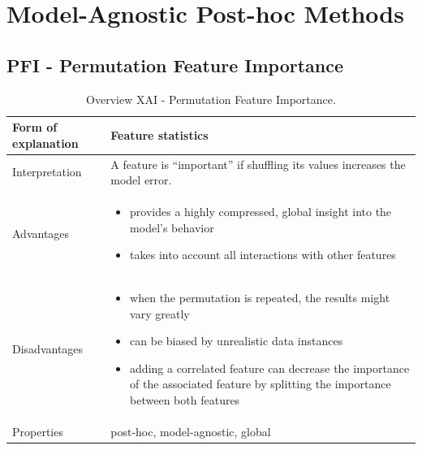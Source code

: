 
\newpage
\section{Model-Agnostic Post-hoc Methods}\label{sec:4}

\subsection{PFI - Permutation Feature Importance}

\begin{table}[H]
  \centering
  \begin{tabular}{|p{}|p{}|}
    \hline
    Form of \newline explanation & 
    Feature statistics \\
    
    \hline
    Interpretation & 
    A feature is “important” if shuffling its values increases the model error. \\
    \hline
    Advantages &
    \begin{itemize}[nosep, left=0em]
        \item provides a highly compressed, global insight into the model’s behavior
        \item takes into account all interactions with other features
    \end{itemize} \\
    
    \hline
    Disadvantages &
    \begin{itemize}[nosep, left=0em]
        \item when the permutation is repeated, the results might vary greatly
        \item can be biased by unrealistic data instances
        \item adding a correlated feature can decrease the importance of the associated feature by splitting the importance between both features
    \end{itemize} \\
    
    \hline
    Properties & 
    post-hoc, model-agnostic, global  \\
    
    \hline
  \end{tabular}
  \caption{Overview XAI - Permutation Feature Importance.}
  \label{tab:XAIPFI}
\end{table}

